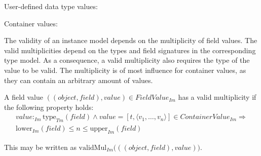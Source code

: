 \begin{defin}
User-defined data type values:
\begin{mathpar}
\end{mathpar}

Container values:

\end{defin}

The validity of an instance model depends on the multiplicity of field values. The valid multiplicities depend on the types and field signatures in the corresponding type model. As a consequence, a valid multiplicity also requires the type of the value to be valid. The multiplicity is of most influence for container values, as they can contain an arbitrary amount of values.

\begin{defin}
\label{defin:formalisations:ecore_formalisation:instance_models:multiplicity_validity}
A field value $( ( object, field ), value ) \in FieldValue_{Im}$ has a valid multiplicity if the following property holds:
\begin{multline*}
    value:_{Im} \mathrm{type}_{Tm}(field) \land value = [ t, \langle v_1, \dotsc, v_n \rangle ] \in ContainerValue_{Im} \Longrightarrow\\ \mathrm{lower}_{Im}(field) \leq n \leq \mathrm{upper}_{Im}(field)
\end{multline*}

This may be written as $\mathrm{validMul}_{Im}\big((( object, field ), value)\big)$.

\end{defin}

